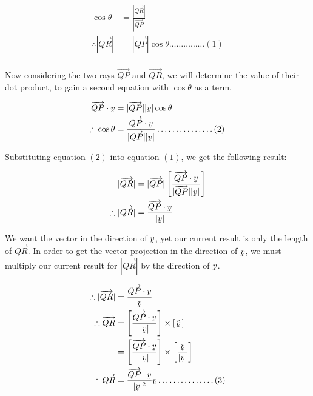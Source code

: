 \documentclass[a4paper]{article}
\begin{document}
\begin{enumerate}[label=\textbf{\arabic*.}]
\begin{enumerate}
		\begin{align*}
		\cos{\theta} & = \frac{|\overrightarrow{QR}|}{|\overrightarrow{QP}|}\\
		\therefore |\overrightarrow{QR}| & = |\overrightarrow{QP}|\cos{\theta}\dots\dots\dots\dots\dots(1)\\
		\end{align*}

		Now considering the two rays $\overrightarrow{QP}$ and $\overrightarrow{QR}$, we will determine the value of their dot product, to gain a second equation with $\cos\theta$ as a term.

		\begin{align*}
		\overrightarrow{QP}\cdot{\underaccent{\tilde}{v}} & = |\overrightarrow{QP}||\underaccent{\tilde}{v}|\cos{\theta}\\
		\therefore \cos{\theta} & = \frac{\overrightarrow{QP}\cdot{\underaccent{\tilde}{v}}}{|\overrightarrow{QP}||\underaccent{\tilde}{v}|}\dots\dots\dots\dots\dots(2)\\
		\end{align*}

		Substituting equation $(2)$ into equation $(1)$, we get the following result:

		\begin{align*}
		|\overrightarrow{QR}| & = |\overrightarrow{QP}|\left[\frac{\overrightarrow{QP}\cdot{\underaccent{\tilde}{v}}}{|\overrightarrow{QP}||\underaccent{\tilde}{v}|}\right]\\
		\therefore |\overrightarrow{QR}| & = \frac{\overrightarrow{QP}\cdot{\underaccent{\tilde}{v}}}{|\underaccent{\tilde}{v}|}
		\end{align*}

		We want the vector in the direction of $\underaccent{\tilde}{v}$, yet our current result is only the length of $\overrightarrow{QR}$. In order to get the vector projection in the direction of $\underaccent{\tilde}{v}$, we must multiply our current result for $|\overrightarrow{QR}|$ by the direction of $\underaccent{\tilde}{v}$.

		\begin{align*}
		\therefore |\overrightarrow{QR}| & = \frac{\overrightarrow{QP}\cdot{\underaccent{\tilde}{v}}}{|\underaccent{\tilde}{v}|}\\
		\therefore \overrightarrow{QR} & = \left[\frac{\overrightarrow{QP}\cdot{\underaccent{\tilde}{v}}}{|\underaccent{\tilde}{v}|}\right]\times[\hspace{0.5mm}\hat{\underaccent{\tilde}{v}}\hspace{0.5mm}]\\
		& = \left[\frac{\overrightarrow{QP}\cdot{\underaccent{\tilde}{v}}}{|\underaccent{\tilde}{v}|}\right]\times\left[\frac{\underaccent{\tilde}{v}}{|\underaccent{\tilde}{v}|}\right]\\
		\therefore \overrightarrow{QR} & = \frac{\overrightarrow{QP}\cdot{\underaccent{\tilde}{v}}}{|\underaccent{\tilde}{v}|^2}\underaccent{\tilde}{v}\dots\dots\dots\dots\dots(3)\\
		\end{align*}


\end{enumerate}
\end{enumerate}
\end{document}
